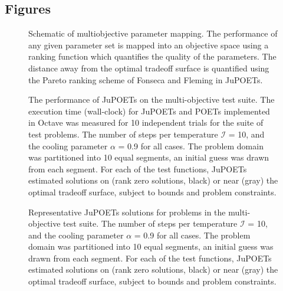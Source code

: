 \documentclass{bmcart}
\begin{document}
\begin{backmatter}


\clearpage

\section*{Figures}

\begin{figure}[h]
  \caption{Schematic of multiobjective parameter mapping. The performance of any given parameter set is mapped into an objective space using a ranking function which quantifies the quality of the parameters. The distance away from the optimal tradeoff surface is quantified using the Pareto ranking scheme of Fonseca and Fleming in JuPOETs.}\label{fig:fig-MOSAalgorithm}
\end{figure}

\begin{figure}[h]
  \caption{The performance of JuPOETs on the multi-objective test suite.
  The execution time (wall-clock) for JuPOETs and POETs implemented in Octave was measured for 10 independent trials for the suite of test problems.
  The number of steps per temperature $\mathcal{I}$ = 10, and the cooling parameter $\alpha$ = 0.9 for all cases.
  The problem domain was partitioned into 10 equal segments, an initial guess was drawn from each segment.
  For each of the test functions, JuPOETs estimated solutions on (rank zero solutions, black) or near (gray) the optimal tradeoff surface, subject to bounds and problem constraints.  }\label{fig:fig-timing}
\end{figure}

\begin{figure}[h]
  \caption{Representative JuPOETs solutions for problems in the multi-objective test suite.
  The number of steps per temperature $\mathcal{I}$ = 10, and the cooling parameter $\alpha$ = 0.9 for all cases.
  The problem domain was partitioned into 10 equal segments, an initial guess was drawn from each segment.
  For each of the test functions, JuPOETs estimated solutions on (rank zero solutions, black) or near (gray) the optimal tradeoff surface, subject to bounds and problem constraints.  }\label{fig:fig-surfaces}
\end{figure}


\end{backmatter}
\end{document}
